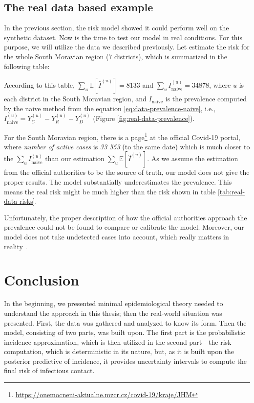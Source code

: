 \documentclass[
  digital, %
  oneside, %
  lof,     %
  lot,     %
]{fithesis4}
\begin{document}
\section{The real data based example}

In the previous section, the risk model showed it could perform well on the synthetic dataset.
Now is the time to test our model in real conditions.
For this purpose, we will utilize the data we described previously.
Let estimate the risk for the whole South Moravian region (7 districts), which is summarized in the following table:



According to this table, $\sum_u \mathbb{E}[\hat{I}^{(u)}] = 8 133$ and $\sum_u I_\text{naive}^{(u)} = 34 878$, where $u$ is each district in the South Moravian region, and $I_\text{naive}$ is the prevalence computed by the naive method from the equation \eqref{eq:data-prevalence-naive}, i.e., $I_\text{naive}^{(u)} = Y_C^{(u)} - Y_R^{(u)} - Y_D^{(u)}$ (Figure \ref{fig:real-data-prevalence}).

For the South Moravian region, there is a page\footnote{\url{https://onemocneni-aktualne.mzcr.cz/covid-19/kraje/JHM}} at the official Covid-19 portal, where \textit{number of active cases} is \textit{33 553} (to the same date) which is much closer to the $\sum_u I_\text{naive}^{(u)}$ than our estimation $\sum_u \mathbb{E}[\hat{I}^{(u)}]$.
As we assume the estimation from the official authorities to be the source of truth, our model does not give the proper results.
The model substantially underestimates the prevalence.
This means the real risk might be much higher than the risk shown in table \ref{tab:real-data-risks}.

Unfortunately, the proper description of how the official authorities approach the prevalence could not be found to compare or calibrate the model. Moreover, our model does not take undetected cases into account, which really matters in reality \cite{simone2020}.


\chapter{Conclusion}

In the beginning, we presented minimal epidemiological theory needed to understand the approach in this thesis; then the real-world situation was presented.
First, the data was gathered and analyzed to know its form.
Then the model, consisting of two parts, was built upon.
The first part is the probabilistic incidence approximation, which is then utilized in the second part - the risk computation, which is deterministic in its nature, but, as it is built upon the posterior predictive of incidence, it provides uncertainty intervals to compute the final risk of infectious contact.
\end{document}
